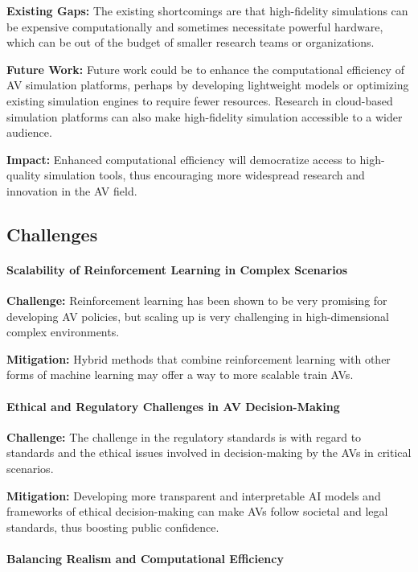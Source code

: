 \documentclass[lettersize,journal]{IEEEtran}
\begin{document}
\textbf{Existing Gaps:} The existing shortcomings are that high-fidelity simulations can be expensive computationally and sometimes necessitate powerful hardware, which can be out of the budget of smaller research teams or organizations.

\textbf{Future Work:} Future work could be to enhance the computational efficiency of AV simulation platforms, perhaps by developing lightweight models or optimizing existing simulation engines to require fewer resources. Research in cloud-based simulation platforms can also make high-fidelity simulation accessible to a wider audience.

\textbf{Impact:} Enhanced computational efficiency will democratize access to high-quality simulation tools, thus encouraging more widespread research and innovation in the AV field.


\subsection{Challenges}

\paragraph{Scalability of Reinforcement Learning in Complex Scenarios}

\textbf{Challenge:} Reinforcement learning has been shown to be very promising for developing AV policies, but scaling up is very challenging in high-dimensional complex environments.

\textbf{Mitigation:} Hybrid methods that combine reinforcement learning with other forms of machine learning may offer a way to more scalable train AVs.

\paragraph{Ethical and Regulatory Challenges in AV Decision-Making}

\textbf{Challenge:} The challenge in the regulatory standards is with regard to standards and the ethical issues involved in decision-making by the AVs in critical scenarios.

\textbf{Mitigation:} Developing more transparent and interpretable AI models and frameworks of ethical decision-making can make AVs follow societal and legal standards, thus boosting public confidence.

\paragraph{Balancing Realism and Computational Efficiency}
\end{document}
